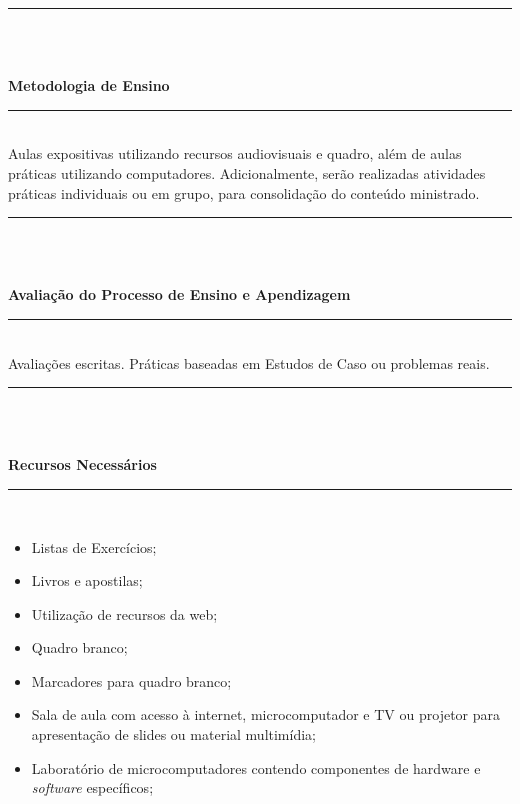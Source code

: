 \noindent\rule{16.5cm}{0.4pt}\\
\\
\vspace{-12mm}
\begin{center}\textbf{Metodologia de Ensino}\end{center} 
\vspace{-5mm}
\noindent\rule{16.5cm}{0.4pt}
\\
   Aulas expositivas utilizando recursos audiovisuais e quadro, além de aulas práticas utilizando computadores. Adicionalmente, serão realizadas atividades práticas individuais ou em grupo, para consolidação do conteúdo ministrado.\\
\noindent\rule{16.5cm}{0.4pt}\\
\\
\vspace{-12mm}
\begin{center}\textbf{Avaliação do Processo de Ensino e Apendizagem}\end{center}
\vspace{-5mm}
\noindent\rule{16.5cm}{0.4pt}
\\
   Avaliações escritas. Práticas baseadas em Estudos de Caso ou problemas reais.\\
\noindent\rule{16.5cm}{0.4pt}\\
\\
\vspace{-12mm}
\begin{center}\textbf{Recursos Necessários}\end{center}
\vspace{-5mm}
\noindent\rule{16.5cm}{0.4pt}
\\
\begin{itemize} 
  \item Listas de Exercícios;
  \item Livros e apostilas;
  \item Utilização de recursos da web;
  \item Quadro branco;
  \item Marcadores para quadro branco;
  \item Sala de aula com acesso à internet, microcomputador e TV ou projetor para apresentação de slides ou material multimídia;
  \item Laboratório de microcomputadores contendo componentes de hardware e \textit{software} específicos;
\end{itemize}
